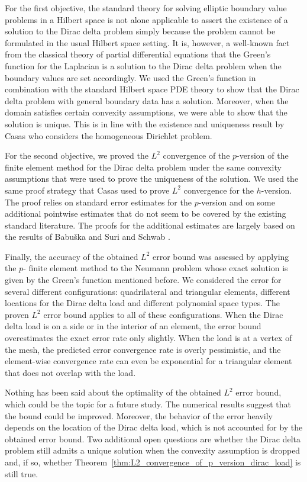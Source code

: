 \documentclass[english, 12pt, a4paper, sci, utf8, a-2b, online]{aaltothesis}
\theoremstyle{definition}
\theoremstyle{plain}
\numberwithin{equation}{section}
\begin{document}
For the first objective, the standard theory for solving elliptic boundary value problems
in a Hilbert space is not alone applicable to assert the existence of a solution to the
Dirac delta problem simply because the problem cannot be formulated in the
usual Hilbert space setting. It is, however, a well-known fact from the classical theory of
partial differential equations that the Green's function for the Laplacian is a solution to the 
Dirac delta problem when the boundary values are set accordingly.
We used the Green's function in combination with the standard Hilbert space PDE theory
to show that the Dirac delta problem with general boundary data has a solution.
Moreover, when the domain satisfies certain convexity assumptions,
we were able to show that the solution is unique. This is in line with the existence and uniqueness
result by Casas \cite{casas1985} who considers the homogeneous Dirichlet problem.

For the second objective, we proved the $L^2$ convergence of the $p$-version of the finite element
method for the Dirac delta problem under the same convexity assumptions that were used to prove the
uniqueness of the solution. We used the same proof strategy that Casas \cite{casas1985}
used to prove $L^2$ convergence for the $h$-version. The proof relies on standard error estimates
for the $p$-version and on some additional pointwise estimates that do not seem to
be covered by the existing standard literature. The proofs for the additional estimates
are largely based on the results of Babu{\v s}ka and Suri \cite{babuskasuri1987} and
Schwab \cite{schwab1998}.

Finally, the accuracy of the obtained $L^2$ error bound was assessed by applying the
$p$- finite element method to the Neumann problem whose exact solution is given by
the Green's function mentioned before. We considered the error for several different configurations:
quadrilateral and triangular elements, different locations for the Dirac delta load and
different polynomial space types. The proven $L^2$ error bound applies to all of these
configurations. When the Dirac delta load is on a side or in the interior of an element,
the error bound overestimates the exact error rate only slightly.
When the load is at a vertex of the mesh, the predicted error convergence rate
is overly pessimistic, and the element-wise convergence rate can even be exponential
for a triangular element that does not overlap with the load.

Nothing has been said about the optimality of the obtained $L^2$ error bound,
which could be the topic for a future study. The numerical results suggest
that the bound could be improved. Moreover, the behavior of the error heavily depends
on the location of the Dirac delta load, which is not accounted for by the obtained error bound.
Two additional open questions are whether the Dirac delta problem still admits a unique solution
when the convexity assumption is dropped and, if so,
whether Theorem~\ref{thm:L2_convergence_of_p_version_dirac_load} is still true.

\clearpage
\thesisbibliography


\end{document}
